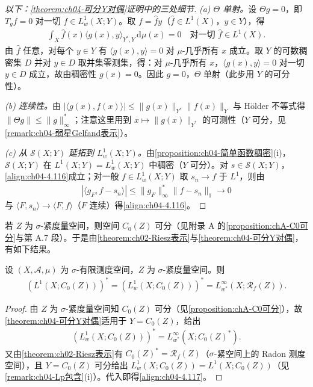 \documentclass[../../main.tex]{subfiles}%
\begin{document}
\begin{proof}[以下：\cref{theorem:ch04-可分Y对偶}证明中的三处细节]
\emph{(a) $\Theta$ 单射。}设 $\Theta g=0$，即 $T_gf=0$ 对一切 $f\in L^1_w(X;Y)$。取 $f=\hat fy$（$\hat f\in L^1(X)$，$y\in Y$），得
\begin{align*}
\int_X\hat f(x)\langle g(x),y\rangle_{Y^*,Y}\,\mathrm{d}\mu(x)=0\quad\text{对一切 }\hat f\in L^1(X).
\end{align*}
由 $\hat f$ 任意，对每个 $y\in Y$ 有 $\langle g(x),y\rangle=0$ 对 $\mu$-几乎所有 $x$ 成立。取 $Y$ 的可数稠密集 $D$ 并对 $y\in D$ 取并集零测集，得：对 $\mu$-几乎所有 $x$，$\langle g(x),y\rangle=0$ 对一切 $y\in D$ 成立，故由稠密性 $g(x)=0$。因此 $g=0$，$\Theta$ 单射（此步用 $Y$ 的可分性）。

\emph{(b) 连续性。}由 $|\langle g(x),f(x)\rangle|\leqslant\|g(x)\|_{Y^*}\|f(x)\|_Y$ 与 Hölder 不等式得 $\|\Theta g\|\leqslant\|g\|_\infty^*$；注意这里用到 $x\mapsto\|g(x)\|_{Y^*}$ 的可测性（$Y$ 可分，见\cref{remark:ch04-弱星Gelfand表示}）。

\emph{(c) 从 $\mathcal{S}(X;Y)$ 延拓到 $L^1_w(X;Y)$。}由\cref{proposition:ch04-简单函数稠密}(i)，$\mathcal{S}(X;Y)$ 在 $L^1(X;Y)=L^1_w(X;Y)$ 中稠密（$Y$ 可分）。对 $s\in\mathcal{S}(X;Y)$，\eqref{align:ch04-4.116}成立；对一般 $f\in L^1_w(X;Y)$ 取 $s_n\to f$ 于 $L^1$，则由
\begin{align*}
|\langle g_F,f-s_n\rangle|\leqslant\|g_F\|_\infty^*\|f-s_n\|_1\to0
\end{align*}
与 $\langle F,s_n\rangle\to\langle F,f\rangle$（$F$ 连续）得\eqref{align:ch04-4.116}。
\end{proof}

若 $Z$ 为 $\sigma$-紧度量空间，则空间 $C_0(Z)$ 可分（见附录 A 的\cref{proposition:chA-C0可分}与第 A.7 段）。于是由\cref{theorem:ch02-Riesz表示}与\cref{theorem:ch04-可分Y对偶}，有如下结果。

\begin{proposition}\label{proposition:ch04-C0对偶}
设 $(X,\mathcal{A},\mu)$ 为 $\sigma$-有限测度空间，$Z$ 为 $\sigma$-紧度量空间。则
\begin{align}
(L^1(X;C_0(Z)))^*=(L^1_w(X;C_0(Z)))^*=L^\infty_{w^*}(X;\mathscr{R}_f(Z)). \label{align:ch04-4.117}
\end{align}
\end{proposition}

\begin{proof}
由 $Z$ 为 $\sigma$-紧度量空间知 $C_0(Z)$ 可分（见\cref{proposition:chA-C0可分}），故\cref{theorem:ch04-可分Y对偶}适用于 $Y=C_0(Z)$，给出
\begin{align*}
(L^1_w(X;C_0(Z)))^*=L^\infty_{w^*}(X;C_0(Z)^*).
\end{align*}
又由\cref{theorem:ch02-Riesz表示}有 $C_0(Z)^*=\mathscr{R}_f(Z)$（$\sigma$-紧空间上的 Radon 测度空间），且 $Y=C_0(Z)$ 可分给出 $L^1_w(X;C_0(Z))=L^1(X;C_0(Z))$（见\cref{remark:ch04-Lp包含}(i)）。代入即得\eqref{align:ch04-4.117}。
\end{proof}
\end{document}
